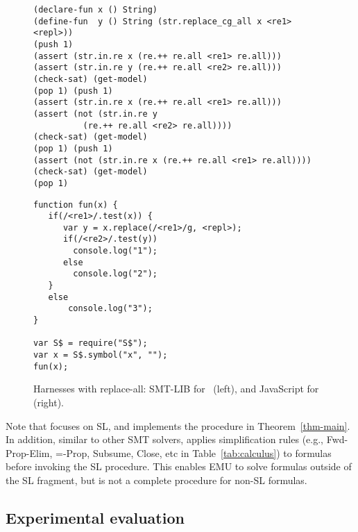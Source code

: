 \begin{figure}[tb]
  \scriptsize

  \begin{minipage}{0.55\linewidth}
\begin{verbatim}
(declare-fun x () String)
(define-fun  y () String (str.replace_cg_all x <re1> <repl>))
(push 1)
(assert (str.in.re x (re.++ re.all <re1> re.all)))
(assert (str.in.re y (re.++ re.all <re2> re.all)))
(check-sat) (get-model)
(pop 1) (push 1)
(assert (str.in.re x (re.++ re.all <re1> re.all)))
(assert (not (str.in.re y 
          (re.++ re.all <re2> re.all))))
(check-sat) (get-model)
(pop 1) (push 1)
(assert (not (str.in.re x (re.++ re.all <re1> re.all))))
(check-sat) (get-model)
(pop 1)
\end{verbatim}
  \end{minipage}\hfill
  \raisebox{-19.2ex}{\rule{0.4pt}{40ex}}\hfill
  \begin{minipage}{0.43\linewidth}
\begin{verbatim}
function fun(x) {
   if(/<re1>/.test(x)) {
      var y = x.replace(/<re1>/g, <repl>);
      if(/<re2>/.test(y))
        console.log("1");
      else
        console.log("2");
   }
   else
       console.log("3");
}

var S$ = require("S$");
var x = S$.symbol("x", "");
fun(x);
\end{verbatim}
  \end{minipage}
  
  \caption{Harnesses with replace-all: SMT-LIB for \ostrich\ (left),
    and JavaScript for \expose{} (right).}
  \label{fig:harness}
  \vspace{-4mm}
\end{figure}

\color{red}
Note that {\ostrich} focuses on SL, and implements the procedure in Theorem~\ref{thm-main}. In addition, similar to other SMT solvers, {\ostrich} applies simplification rules (e.g., {\sf Fwd-Prop-Elim, =-Prop, Subsume, Close}, etc in Table~\ref{tab:calculus}) to formulas before invoking the SL procedure.  This enables EMU to solve formulas outside of the SL fragment, but is not a complete procedure for non-SL formulas. 
\color{black}


\subsection{Experimental evaluation}

